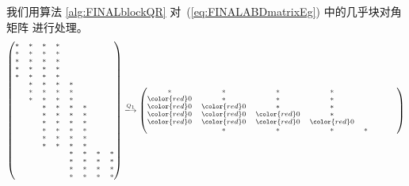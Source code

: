   \begin{exm}
    \label{exm:FINALblockQREg}
    我们用算法 \ref{alg:FINALblockQR} 对~(\ref{eq:FINALABDmatrixEg}) 中的几乎块对角矩阵
    进行处理。
    \begin{eqnarray}
    \begin{scriptsize}
      \begin{aligned}
        \begin{pmatrix}
      \ast& \ast& \ast& \ast&  &  &  &\\
      \ast& \ast& \ast& \ast&  &  &  &\\
      \ast& \ast& \ast& \ast&  &  &  &\\
      \ast& \ast& \ast& \ast&  &  &  &\\
      \ast& \ast& \ast& \ast&  &  &  &\\
          & \ast& \ast& \ast& \ast&  &  &\\
          & \ast& \ast& \ast& \ast&  &  &\\
          & \ast& \ast& \ast& \ast&  &  &\\
          &  & \ast& \ast& \ast& \ast&  &\\
          &  & \ast& \ast& \ast& \ast&  &\\
          &  & \ast& \ast& \ast& \ast&  &\\
          &  & \ast& \ast& \ast& \ast&  &\\
          &  & \ast& \ast& \ast& \ast&  &\\
          &  & \ast& \ast& \ast& \ast&  &\\
          &  &  &  & \ast& \ast& \ast& \ast\\
          &  &  &  & \ast& \ast& \ast& \ast\\
          &  &  &  & \ast& \ast& \ast& \ast\\
          &  &  &  & \ast& \ast& \ast& \ast
    \end{pmatrix}    
        \overset{{Q}_1}{\longrightarrow}
        \begin{pmatrix}
      \ast& \ast& \ast& \ast&  &  &  &\\
      {\color{red} 0}& \ast& \ast& \ast&  &  &  &\\
      {\color{red} 0}& {\color{red} 0}& \ast& \ast&  &  &  &\\
      {\color{red} 0}& {\color{red} 0}& {\color{red} 0}& \ast&  &  &  &\\
      {\color{red} 0}& {\color{red} 0}& {\color{red} 0}& {\color{red} 0}&  &  &  &\\
          & \ast& \ast& \ast& \ast&  &  &\\

\end{pmatrix}
\end{aligned}
\end{scriptsize}
\end{eqnarray}
\end{exm}
